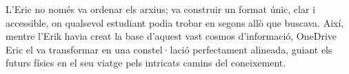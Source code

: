 L'Eric no només va ordenar els arxius; va construir un format únic, clar i accessible, on qualsevol estudiant podia trobar en segons allò que buscava. Així, mentre l'Erik havia creat la base d'aquest vast cosmos d'informació, OneDrive Eric el va transformar en una constel·lació perfectament alineada, guiant els futurs físics en el seu viatge pels intricats camins del coneixement.\\





















